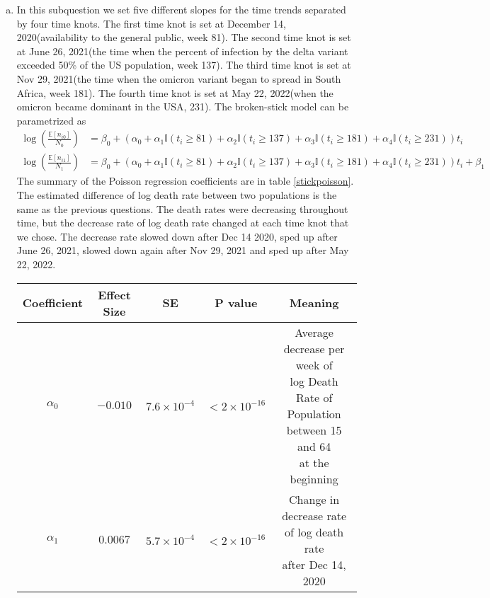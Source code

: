 \documentclass[12pt]{article}
\begin{document}
\begin{enumerate}[(a)]
	\item In this subquestion we set five different slopes for the time trends separated by four time knots. The first time knot is set at December 14, 2020(availability to the general public, week 81). The second time knot is set at June 26, 2021(the time when the percent of infection by the delta variant exceeded 50\% of the US population, week 137). The third time knot is set at Nov 29, 2021(the time when the omicron variant began to spread in South Africa, week 181). The fourth time knot is set at May 22, 2022(when the omicron became dominant in the USA, 231). The broken-stick model can be parametrized as
	 \begin{align*}
		\log(\frac{\mathbb{E}[n_{i0}]}{N_{0}}) &= \beta_{0} + \left(\alpha_{0} + \alpha_{1}\mathbb{I}(t_{i} \geq 81) + \alpha_{2}\mathbb{I}(t_{i} \geq 137) +\alpha_{3} \mathbb{I}(t_{i} \geq 181) + \alpha_{4}\mathbb{I}(t_{i} \geq 231)\right) t_{i}\\
		\log(\frac{\mathbb{E}[n_{i1}]}{N_{1}}) &= \beta_{0} + \left(\alpha_{0} + \alpha_{1}\mathbb{I}(t_{i} \geq 81) + \alpha_{2}\mathbb{I}(t_{i} \geq 137) +\alpha_{3} \mathbb{I}(t_{i} \geq 181) + \alpha_{4}\mathbb{I}(t_{i} \geq 231)\right) t_{i} + \beta_{1}
	\end{align*}
	The summary of the Poisson regression coefficients are in table \ref{stickpoisson}. The estimated difference of log death rate between two populations is the same as the previous questions. The death rates were decreasing throughout time, but the decrease rate of log death rate changed at each time knot that we chose. The decrease rate slowed down after Dec 14 2020, sped up after June 26, 2021, slowed down again after Nov 29, 2021 and sped up after May 22, 2022. 
	\begin{table}[htbp]
		\centering
		\begin{tabular}{ccccc}
			\toprule
			Coefficient & Effect Size & SE & P value & Meaning\\
			\midrule
			$\alpha_{0}$ & $-0.010$ & $7.6\times 10^{-4}$ & $<2\times 10^{-16}$ & \makecell{Average decrease per week of \\ log Death Rate of  Population \\ between 15 and 64 \\ at the beginning}\\
			\addlinespace[0.3cm]
			$\alpha_{1}$ & $0.0067$ & $5.7\times 10^{-4}$ & $<2\times 10^{-16}$& \makecell{Change in decrease rate \\ of log death rate\\ after Dec 14, 2020}\\

\end{tabular}
\end{table}
\end{enumerate}
\end{document}
